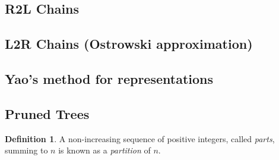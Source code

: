 \documentclass{ucalgthes1}
\theoremstyle{plain}
\theoremstyle{definition}
\newtheorem{defn}[thm]{Definition}
\begin{document}
\bigbreak
\subsection{R2L Chains}

\bigbreak
\subsection{L2R Chains (Ostrowski approximation)}

\bigbreak
\subsection{Yao's method for representations}

\bigbreak
\subsection{Pruned Trees}




\begin{defn}
A non-increasing sequence of positive integers, called \emph{parts}, summing to $n$ is known as a \emph{partition} of $n$.
\end{defn}
\end{document}
